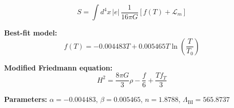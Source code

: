 
\begin{equation}
  S = \int d^4x \, |e| \, \frac{1}{16\pi G} \left[ f(T) + \mathcal{L}_m \right]
\end{equation}

\textbf{Best-fit model:}
\begin{equation}
  f(T) = -0.004483 T + 0.005465 T \ln\!\left(\frac{T}{T_0}\right)
\end{equation}

\textbf{Modified Friedmann equation:}
\begin{equation}
  H^2 = \frac{8\pi G}{3} \rho - \frac{f}{6} + \frac{T f_T}{3}
\end{equation}

\textbf{Parameters:}
$\alpha = -0.004483$, \quad
$\beta = 0.005465$, \quad
$n = 1.8788$, \quad
$\Lambda_{\text{BI}} = 565.8737$